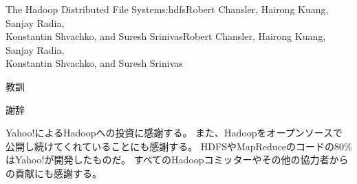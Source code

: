 \begin{aosachaptertoc}{The Hadoop Distributed File System}{s:hdfs}{Robert Chansler, Hairong Kuang, Sanjay Radia, \\ Konstantin Shvachko, and Suresh Srinivas}{Robert Chansler, Hairong Kuang, Sanjay Radia, \\ \hspace*{0.9cm} Konstantin Shvachko, and Suresh Srinivas}
\begin{aosasect1}{教訓}
\end{aosasect1}

\begin{aosasect1}{謝辞}

Yahoo!によるHadoopへの投資に感謝する。
また、Hadoopをオープンソースで公開し続けてくれていることにも感謝する。
HDFSやMapReduceのコードの80\%はYahoo!が開発したものだ。
すべてのHadoopコミッターやその他の協力者からの貢献にも感謝する。

\end{aosasect1}

\end{aosachaptertoc}
